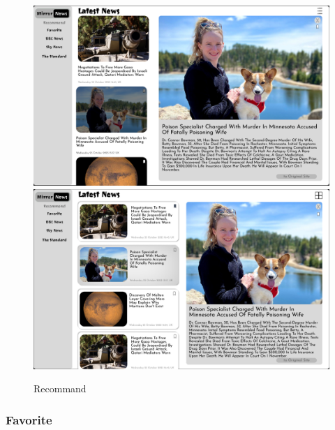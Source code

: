 \documentclass[a4paper]{article}
\begin{document}
\begin{figure}[H] %
	\centering %
	\includegraphics[width=1\textwidth]{./images/Recommand.png} %
	\includegraphics[width=1\textwidth]{./images/Recommand 2.png} %
	\caption*{Recommand} %
	\label{Fig.Recommand} %
\end{figure}

\subsubsection{Favorite}
\end{document}
